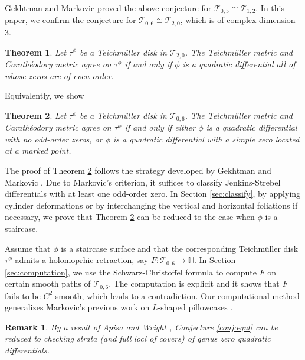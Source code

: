 \documentclass[11pt]{amsart}
\theoremstyle{plain}
\newtheorem{Theorem}{Theorem}[section]
\newtheorem{Remark}{Remark}
\newcommand{\Tei}{\mathcal{T}}
\begin{document}
Gekhtman and Markovic \cite[Theorem 1.2]{GM2020} proved the above conjecture for $\Tei_{0,5}\cong\Tei_{1,2}$. 
In this paper, we confirm the conjecture for $\Tei_{0,6}\cong\Tei_{2,0}$,
which is of complex dimension $3$. 


\begin{Theorem}\label{thm:main}
Let $\tau^{\phi}$ be a Teichm\"{u}ller disk in $ \Tei_{2,0}$.
    The Teichm\"uller metric and Carath\'{e}odory metric agree on $\tau^{\phi}$  if and only if  $\phi$ is a quadratic differential all of whose zeros are of even order.  
 \end{Theorem}
 
Equivalently, we show

\begin{Theorem}\label{thm:main2}
Let $\tau^{\phi}$ be a Teichm\"{u}ller disk in $\Tei_{0,6}$.
    The Teichm\"uller metric and Carath\'{e}odory metric agree on $\tau^{\phi}$  if and only if  either $\phi$ is a quadratic differential with no odd-order zeros, or $\phi$ is a quadratic differential with a simple zero located at a marked point.    
 \end{Theorem}
 
The proof of Theorem \ref{thm:main2}  follows the strategy developed by Gekhtman and Markovic \cite{Markovic2018, GM2020}. 
Due to Markovic's criterion, it suffices to classify Jenkins-Strebel differentials 
with at least one odd-order zero. In Section \ref{sec:classify}, by applying cylinder deformations or by interchanging the vertical and horizontal foliations if necessary, we prove  that Theorem \ref{thm:main2} can be reduced to  the case when $\phi$ is a staircase.

Assume that $\phi$ is a staircase surface and that the corresponding Teichm\"uller disk $\tau^{\phi}$
admits a holomoprhic retraction, say
$F: \mathcal{T}_{0,6} \to \mathbb{H}$. 
In Section \ref{sec:computation}, we use the Schwarz-Christoffel formula to compute $F$ on certain smooth paths of $\mathcal{T}_{0,6}$. The computation is explicit and it shows that  $F$ fails to be $C^2$-smooth, which leads to a contradiction. 
Our computational method generalizes Markovic's previous work on $L$-shaped pillowcases \cite{Markovic2018}. 





\begin{Remark}
By a result of Apisa and Wright \cite[Corollary 1.3]{AW2022},
Conjecture \ref{conj:equl} can be reduced to checking strata (and full loci of covers)
of genus zero quadratic differentials.
\end{Remark}
\end{document}
